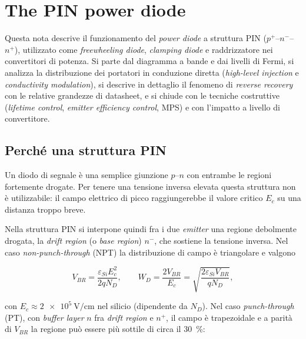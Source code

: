 \chapter{The PIN power diode}
\label{ch:pindiode}
\begin{chapabstract}
\noindent
Questa nota descrive il funzionamento del \emph{power diode} a struttura PIN
($p^{+}$--$n^{-}$--$n^{+}$), utilizzato come \emph{freewheeling diode},
\emph{clamping diode} e raddrizzatore nei convertitori di potenza. Si parte dal
diagramma a bande e dai livelli di Fermi, si analizza la distribuzione dei
portatori in conduzione diretta (\emph{high-level injection} e
\emph{conductivity modulation}), si descrive in dettaglio il fenomeno di
\emph{reverse recovery} con le relative grandezze di datasheet, e si chiude con
le tecniche costruttive (\emph{lifetime control}, \emph{emitter efficiency
control}, MPS) e con l'impatto a livello di convertitore.
\end{chapabstract}

\bigskip

\section{Perché una struttura PIN}

Un diodo di segnale è una semplice giunzione $p$--$n$ con entrambe le regioni
fortemente drogate. Per tenere una tensione inversa elevata questa struttura non
è utilizzabile: il campo elettrico di picco raggiungerebbe il valore critico
$E_c$ su una distanza troppo breve.

Nella struttura PIN si interpone quindi fra i due \emph{emitter} una regione
debolmente drogata, la \emph{drift region} (o \emph{base region}) $n^{-}$, che
sostiene la tensione inversa. Nel caso \emph{non-punch-through} (NPT) la
distribuzione di campo è triangolare e valgono

\begin{equation}
V_{BR} = \frac{\varepsilon_{Si} E_c^{2}}{2 q N_D},
\qquad
W_{D} = \frac{2 V_{BR}}{E_c} = \sqrt{\frac{2 \varepsilon_{Si} V_{BR}}{q N_D}} ,
\end{equation}

con $E_c \approx \SI{2e5}{\volt\per\centi\meter}$ nel silicio (dipendente da
$N_D$). Nel caso \emph{punch-through} (PT), con \emph{buffer layer} $n$ fra
\emph{drift region} e $n^{+}$, il campo è trapezoidale e a parità di $V_{BR}$ la
regione può essere più sottile di circa il \SI{30}{\percent}:


